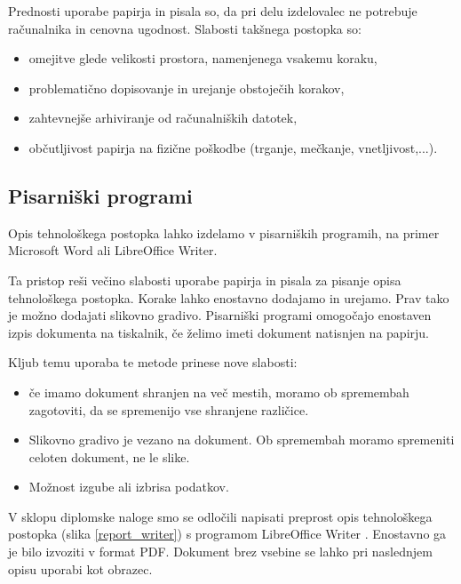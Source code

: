 \documentclass[a4paper, 12pt]{book}
\begin{document}
Prednosti uporabe papirja in pisala so, da pri delu izdelovalec ne potrebuje računalnika in cenovna ugodnost.
Slabosti takšnega postopka so:
\begin{itemize}
	\item omejitve glede velikosti prostora, namenjenega vsakemu koraku,
	\item problematično dopisovanje in urejanje obstoječih korakov,
	\item zahtevnejše arhiviranje od računalniških datotek,
	\item občutljivost papirja na fizične poškodbe (trganje, mečkanje, vnetljivost,...).
\end{itemize}


\subsection{Pisarniški programi}

Opis tehnološkega postopka lahko izdelamo v pisarniških programih, na primer Microsoft Word ali LibreOffice Writer.

Ta pristop reši večino slabosti uporabe papirja in pisala za pisanje opisa tehnološkega postopka.
Korake lahko enostavno dodajamo in urejamo.
Prav tako je možno dodajati slikovno gradivo.
Pisarniški programi omogočajo enostaven izpis dokumenta na tiskalnik, če želimo imeti dokument natisnjen na papirju.

Kljub temu uporaba te metode prinese nove slabosti:
\begin{itemize}
	\item če imamo dokument shranjen na več mestih, moramo ob spremembah zagotoviti, da se spremenijo vse shranjene različice. 
	\item Slikovno gradivo je vezano na dokument. Ob spremembah moramo spremeniti celoten dokument, ne le slike.
	\item Možnost izgube ali izbrisa podatkov.
\end{itemize}

V sklopu diplomske naloge smo se odločili napisati preprost opis tehnološkega postopka (slika \ref{report_writer}) s programom LibreOffice Writer \cite{writer}.
Enostavno ga je bilo izvoziti v format PDF.
Dokument brez vsebine se lahko pri naslednjem opisu uporabi kot obrazec.
\end{document}
